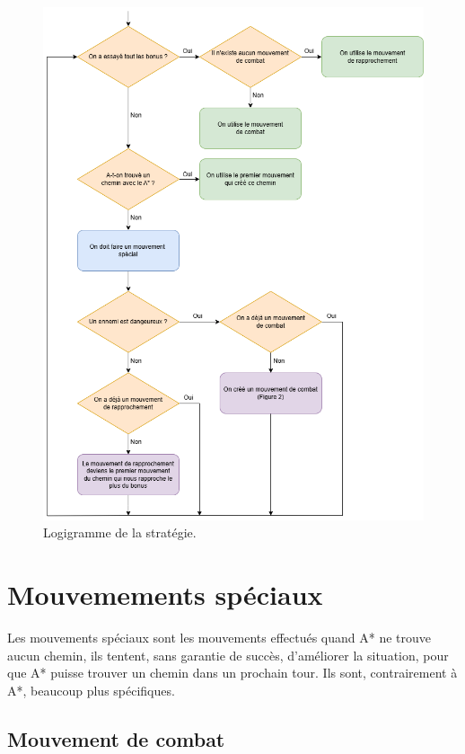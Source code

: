 \begin{figure}[!htpb]
    \centering
    \includegraphics[width=\linewidth]{Figures/diagramme1.png}
    \caption[Logigramme de la stratégie.]{Logigramme de la stratégie.}
    \label{fig:logigramme}
\end{figure}

\newpage

\section{Mouvemements spéciaux}

Les mouvements spéciaux sont les mouvements effectués quand A* ne trouve aucun chemin, ils tentent, sans garantie de succès, d'améliorer la situation, pour que A* puisse trouver un chemin dans un prochain tour.
\newline
Ils sont, contrairement à A*, beaucoup plus spécifiques.

\subsection{Mouvement de combat}


